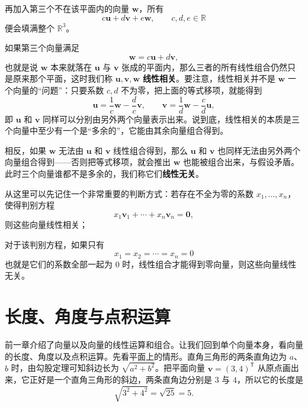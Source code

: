\documentclass[UTF8,a4paper,12pt]{ctexart}
\numberwithin{equation}{section}
\newcommand{\R}{\mathbb{R}}
\newcommand{\trans}{^{\mathsf T}}
\begin{document}
	再加入第三个不在该平面内的向量 $\bm{w}$，所有
	\begin{equation}\label{eq:1.9}
	c\bm{u}+d\bm{v}+e\bm{w},\qquad c,d,e\in\R
	\end{equation}
	便会填满整个 $\R^3$。
	
	如果第三个向量满足
	\begin{equation}\label{eq:1.10}
	\bm{w}=c\bm{u}+d\bm{v},
	\end{equation}
	也就是说 $\bm{w}$ 本来就落在 $\bm{u}$ 与 $\bm{v}$ 张成的平面内，那么三者的所有线性组合仍然只是原来那个平面，这时我们称 $\bm{u},\bm{v},\bm{w}$ \textbf{线性相关}。要注意，线性相关并不是 $\bm{w}$ 一个向量的“问题”：只要系数 $c,d$ 不为零，把上面的等式移项，就能得到
	\begin{equation}\label{eq:1.11}
	\bm{u}=\frac{1}{c}\bm{w}-\frac{d}{c}\bm{v},
	\qquad
	\bm{v}=\frac{1}{d}\bm{w}-\frac{c}{d}\bm{u},
	\end{equation}
	即 $\bm{u}$ 和 $\bm{v}$ 同样可以分别由另外两个向量表示出来。说到底，线性相关的本质是三个向量中至少有一个是“多余的”，它能由其余向量组合得到。
	
	相反，如果 $\bm{w}$ 无法由 $\bm{u}$ 和 $\bm{v}$ 线性组合得到，那么 $\bm{u}$ 和 $\bm{v}$ 也同样无法由另外两个向量组合得到——否则把等式移项，就会推出 $\bm{w}$ 也能被组合出来，与假设矛盾。此时三个向量谁都不是多余的，我们称它们\textbf{线性无关}。
	
	从这里可以先记住一个非常重要的判断方式：若存在不全为零的系数 $x_1,\ldots,x_n$，使得判别方程
	\begin{equation}\label{eq:1.12}
	x_1\bm{v}_1+\cdots+x_n\bm{v}_n=\bm{0},
	\end{equation}
	则这些向量线性相关；
	
	对于该判别方程，如果只有
	\begin{equation}\label{eq:1.13}
	x_1=x_2=\cdots=x_n=0
	\end{equation}
	也就是它们的系数全部一起为 $0$ 时，线性组合才能得到零向量，则这些向量线性无关。
	\section{长度、角度与点积运算}

	前一章介绍了向量以及向量的线性运算和组合。让我们回到单个向量本身，看向量的长度、角度以及点积运算。先看平面上的情形。直角三角形的两条直角边为 $a$、$b$ 时，由勾股定理可知斜边长为 $\sqrt{a^2+b^2}$。把平面向量 $\bm{v}=(3,4)\trans$ 从原点画出来，它正好是一个直角三角形的斜边，两条直角边分别是 $3$ 与 $4$，所以它的长度是
	\begin{equation}\label{eq:2.1}
	\sqrt{3^2+4^2}=\sqrt{25}=5.
	\end{equation}
\end{document}
